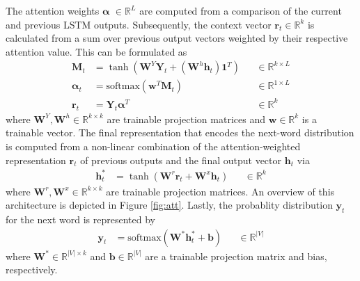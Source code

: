\documentclass{article}
\newcommand{\vect}[1]{\ensuremath{\bm{#1}}}
\newcommand{\mat}[1]{\ensuremath{\bm{#1}}}
\begin{document}
The attention weights $\vect{\alpha}$ $ \in \mathbb{R}^{L}$ are computed from a comparison of the current and previous LSTM outputs. 
Subsequently, the context vector $\vect{r}_t \in \mathbb{R}^{k}$ is calculated from a sum over previous output vectors weighted by their respective attention value. 
This can be formulated as
\begin{align}
    \mat{M}_t &= \tanh(\mat{W}^Y \mat{Y}_t +(\mat{W}^h\vect{h}_t)\vect{1}^T) && \in \mathbb{R}^{k\times L}\label{eq:att1} \\
    \vect{\alpha}_t &= \text{softmax}(\vect{w}^T \mat{M}_t) && \in \mathbb{R}^{1\times L}\\
    \vect{r}_t  &= \mat{Y}_t\vect{\alpha}^T && \in \mathbb{R}^{k}\label{eq:att3}
\end{align}
where $\mat{W}^Y, \mat{W}^h \in \mathbb{R}^{k\times k}$ are trainable projection matrices and $\vect{w} \in \mathbb{R}^{k}$ is a trainable vector. 
The final representation that encodes the next-word distribution is computed from a non-linear combination of the attention-weighted representation $\vect{r}_t$ of previous outputs and the final output vector $\vect{h}_t$ via
\begin{align}
    \vect{h}_t^* &= \tanh(\mat{W}^r \vect{r}_t + \mat{W}^x\vect{h}_t) &&\in \mathbb{R}^{k} \label{eq:att}
\end{align}
where $\mat{W}^r, \mat{W}^x \in\mathbb{R}^{k\times k}$ are trainable projection matrices. An overview of this architecture is depicted in Figure \ref{fig:att}.
Lastly, the probablity distribution $\vect{y}_t$ for the next word  is represented by
\begin{align}
    \vect{y}_t &= \text{softmax}(\mat{W}^* \vect{h}_t^* + \vect{b}) &&\in\mathbb{R}^{|V|}\label{eq:lm}
\end{align}
where $\mat{W}^*\in\mathbb{R}^{|V|\times k}$ and $\vect{b}\in\mathbb{R}^{|V|}$ are a trainable projection matrix and bias, respectively.
\end{document}
